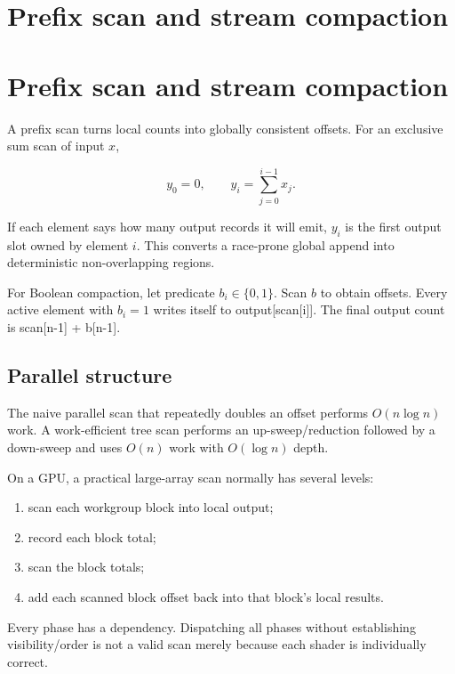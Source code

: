 \hypertarget{appendix-f2ee4d086415}{}
\section*{Prefix scan and stream compaction}
\section{Prefix scan and stream compaction}\label{prefix-scan-and-stream-compaction}

A prefix scan turns local counts into globally consistent offsets. For an exclusive sum scan of input \(x\),

\[
y_0=0,
\qquad
y_i=\sum_{j=0}^{i-1}x_j.
\]

If each element says how many output records it will emit, \(y_i\) is the first output slot owned by element \(i\). This converts a race-prone global append into deterministic non-overlapping regions.

For Boolean compaction, let predicate \(b_i\in\{0,1\}\). Scan \(b\) to obtain offsets. Every active element with \(b_i=1\) writes itself to output{[}scan{[}i{]}{]}. The final output count is scan{[}n-1{]} + b{[}n-1{]}.

\subsection{Parallel structure}\label{parallel-structure}

The naive parallel scan that repeatedly doubles an offset performs \(O(n\log n)\) work. A work-efficient tree scan performs an up-sweep/reduction followed by a down-sweep and uses \(O(n)\) work with \(O(\log n)\) depth.

On a GPU, a practical large-array scan normally has several levels:

\begin{enumerate}
\def\labelenumi{\arabic{enumi}.}
\tightlist
\item
  scan each workgroup block into local output;
\item
  record each block total;
\item
  scan the block totals;
\item
  add each scanned block offset back into that block's local results.
\end{enumerate}

Every phase has a dependency. Dispatching all phases without establishing visibility/order is not a valid scan merely because each shader is individually correct.

